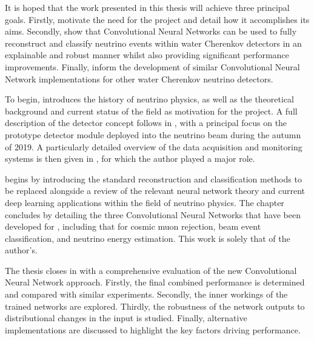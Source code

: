 It is hoped that the work presented in this thesis will achieve three principal goals. Firstly,
motivate the need for the \chips project and detail how it accomplishes its aims. Secondly, show
that Convolutional Neural Networks can be used to fully reconstruct and classify neutrino events
within water Cherenkov detectors in an explainable and robust manner whilst also providing
significant performance improvements. Finally, inform the development of similar Convolutional
Neural Network implementations for other water Cherenkov neutrino detectors.

To begin,  introduces the history of neutrino physics, as well as the
theoretical background and current status of the field as motivation for the \chips project. A
full description of the \chips detector concept follows in , with a
principal focus on the \chipsfive prototype detector module deployed into the \numi neutrino beam
during the autumn of 2019. A particularly detailed overview of the \chipsfive data acquisition and
monitoring systems is then given in , for which the author played a major
role.

 begins by introducing the standard reconstruction and classification methods
to be replaced alongside a review of the relevant neural network theory and current deep learning
applications within the field of neutrino physics. The chapter concludes by detailing the three
Convolutional Neural Networks that have been developed for \chipsfive, including that for cosmic
muon rejection, beam event classification, and neutrino energy estimation. This work is solely
that of the author's.

The thesis closes in  with a comprehensive evaluation of the new
Convolutional Neural Network approach. Firstly, the final combined performance is determined and
compared with similar experiments. Secondly, the inner workings of the trained networks are
explored. Thirdly, the robustness of the network outputs to distributional changes in the input is
studied. Finally, alternative implementations are discussed to highlight the key factors driving
performance.